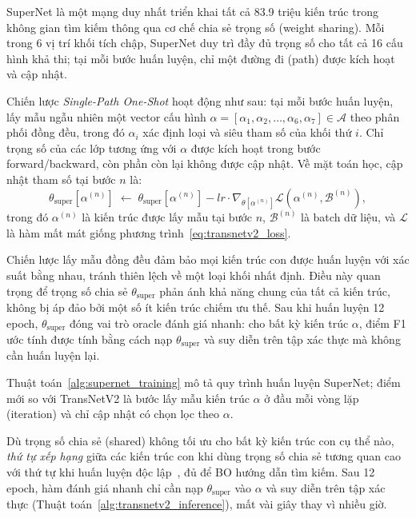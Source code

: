 SuperNet là một mạng duy nhất triển khai tất cả 83.9 triệu kiến trúc trong không gian tìm kiếm thông qua cơ chế chia sẻ trọng số (weight sharing). Mỗi trong 6 vị trí khối tích chập, SuperNet duy trì đầy đủ trọng số cho tất cả 16 cấu hình khả thi; tại mỗi bước huấn luyện, chỉ một đường đi (path) được kích hoạt và cập nhật.

Chiến lược \textit{Single-Path One-Shot} hoạt động như sau: tại mỗi bước huấn luyện, lấy mẫu ngẫu nhiên một vector cấu hình $\alpha = [\alpha_1, \alpha_2, \ldots, \alpha_6, \alpha_7] \in \mathcal{A}$ theo phân phối đồng đều, trong đó $\alpha_i$ xác định loại và siêu tham số của khối thứ $i$. Chỉ trọng số của các lớp tương ứng với $\alpha$ được kích hoạt trong bước forward/backward, còn phần còn lại không được cập nhật. Về mặt toán học, cập nhật tham số tại bước $n$ là:
\begin{equation}
    \theta_{\mathrm{super}}[\alpha^{(n)}]
    \;\leftarrow\;
    \theta_{\mathrm{super}}[\alpha^{(n)}] - lr \cdot \nabla_{\theta[\alpha^{(n)}]} \mathcal{L}(\alpha^{(n)}, \mathcal{B}^{(n)}),
    \label{eq:supernet_update}
\end{equation}
trong đó $\alpha^{(n)}$ là kiến trúc được lấy mẫu tại bước $n$, $\mathcal{B}^{(n)}$ là batch dữ liệu, và $\mathcal{L}$ là hàm mất mát giống phương trình~\eqref{eq:transnetv2_loss}.

Chiến lược lấy mẫu đồng đều đảm bảo mọi kiến trúc con được huấn luyện với xác suất bằng nhau, tránh thiên lệch về một loại khối nhất định. Điều này quan trọng để trọng số chia sẻ $\theta_{\mathrm{super}}$ phản ánh khả năng chung của tất cả kiến trúc, không bị áp đảo bởi một số ít kiến trúc chiếm ưu thế. Sau khi huấn luyện 12 epoch, $\theta_{\mathrm{super}}$ đóng vai trò oracle đánh giá nhanh: cho bất kỳ kiến trúc $\alpha$, điểm F1 ước tính được tính bằng cách nạp $\theta_{\mathrm{super}}$ và suy diễn trên tập xác thực mà không cần huấn luyện lại.

Thuật toán~\ref{alg:supernet_training} mô tả quy trình huấn luyện SuperNet; điểm mới so với TransNetV2 là bước lấy mẫu kiến trúc $\alpha$ ở đầu mỗi vòng lặp (iteration) và chỉ cập nhật có chọn lọc theo $\alpha$.

Dù trọng số chia sẻ (shared) không tối ưu cho bất kỳ kiến trúc con cụ thể nào, \textit{thứ tự xếp hạng} giữa các kiến trúc con khi dùng trọng số chia sẻ tương quan cao với thứ tự khi huấn luyện độc lập~\cite{ren2020_nas_survey}, đủ để BO hướng dẫn tìm kiếm. Sau 12 epoch, hàm đánh giá nhanh chỉ cần nạp $\theta_{\mathrm{super}}$ vào $\alpha$ và suy diễn trên tập xác thực (Thuật toán~\ref{alg:transnetv2_inference}), mất vài giây thay vì nhiều giờ.

